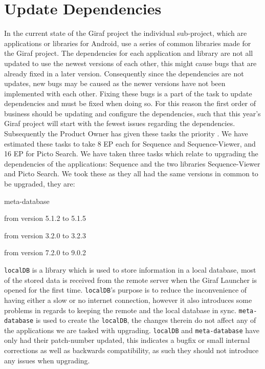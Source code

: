 \section{Update Dependencies}
In the current state of the Giraf project the individual sub-project, which are applications or libraries for Android, use a series of common libraries made for the Giraf project. 
The dependencies for each application and library are not all updated to use the newest versions of each other, this might cause bugs that are already fixed in a later version. 
Consequently since the dependencies are not updates, new bugs may be caused as the newer versions have not been implemented with each other.
Fixing these bugs is a part of the task to update dependencies and must be fixed when doing so.
For this reason the first order of business should be updating and configure the dependencies, such that this year's Giraf project will start with the fewest issues regarding the dependencies. 
Subsequently the Product Owner has given these tasks the priority \phigh. 
We have estimated these tasks to take 8 EP each for Sequence and Sequence-Viewer, and 16 EP for Picto Search. 
We have taken three tasks which relate to upgrading the dependencies of the applications: Sequence and the two libraries Sequence-Viewer and Picto Search. 
We took these as they all had the same versions in common to be upgraded, they are: 
\begin{dankscription}{\ttfamily}{meta-database}
    \item[localDB] from version 5.1.2 to 5.1.5 
    \item[meta-database] from version 3.2.0 to 3.2.3 
    \item[oasisLib] from version 7.2.0 to 9.0.2 
\end{dankscription} 
\texttt{localDB} is a library which is used to store information in a local database, most of the stored data is received from the remote server when the Giraf Launcher is opened for the first time. 
\texttt{localDB}'s purpose is to reduce the inconvenience of having either a slow or no internet connection, however it also introduces some problems in regards to keeping the remote and the local database in sync.  
\texttt{meta-database} is used to create the \texttt{localDB}, the changes therein do not affect any of the applications we are tasked with upgrading. 
\texttt{localDB} and \texttt{meta-database} have only had their patch-number updated, this indicates a bugfix or small internal corrections as well as backwards compatibility, as such they should not introduce any issues when upgrading.
  

